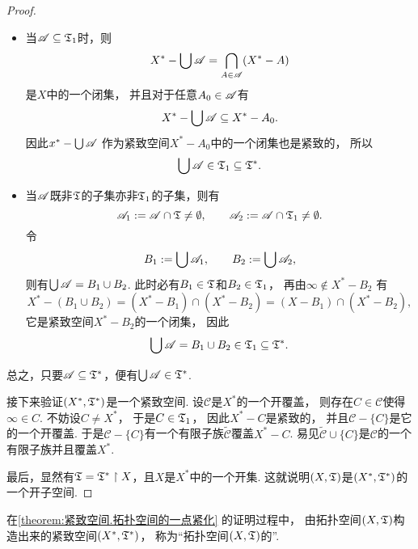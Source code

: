 \begin{theorem}
\begin{proof}
\begin{itemize}
\begin{itemize}
		\item 当\(\mathscr{A} \subseteq {\mathfrak T}_1\)时，则\begin{equation*}
			X^* - \bigcup \mathscr{A} = \bigcap_{A \in \mathscr{A}} (X^* - A)
		\end{equation*}
		是\(X\)中的一个闭集，
		并且对于任意\(A_0 \in \mathscr{A}\)有\begin{equation*}
			X^* - \bigcup \mathscr{A} \subseteq X^* - A_0.
		\end{equation*}
		因此\(x^* - \bigcup \mathscr{A}\)
		作为紧致空间\(X^* - A_0\)中的一个闭集也是紧致的，
		所以\begin{equation*}
			\bigcup \mathscr{A} \in {\mathfrak T}_1 \subseteq {\mathfrak T}^*.
		\end{equation*}

		\item 当\(\mathscr{A}\)既非\({\mathfrak T}\)的子集亦非\({\mathfrak T}_1\)的子集，则有\begin{equation*}
			\mathscr{A}_1 := \mathscr{A} \cap {\mathfrak T} \neq \emptyset,
			\qquad
			\mathscr{A}_2 := \mathscr{A} \cap {\mathfrak T}_1 \neq \emptyset.
		\end{equation*}
		令\begin{equation*}
			B_1 := \bigcup \mathscr{A}_1,
			\qquad
			B_2 := \bigcup \mathscr{A}_2,
		\end{equation*}
		则有\(\bigcup \mathscr{A} = B_1 \cup B_2\).
		此时必有\(B_1 \in {\mathfrak T}\)和\(B_2 \in {\mathfrak T}_1\)，
		再由\(\infty \notin X^* - B_2\)
		有\begin{equation*}
			X^* - (B_1 \cup B_2)
			= (X^* - B_1) \cap (X^* - B_2)
			= (X - B_1) \cap (X^* - B_2),
		\end{equation*}
		它是紧致空间\(X^* - B_2\)的一个闭集，
		因此\begin{equation*}
			\bigcup \mathscr{A}
			= B_1 \cup B_2
			\in {\mathfrak T}_1
			\subseteq {\mathfrak T}^*.
		\end{equation*}
	\end{itemize}
	总之，只要\(\mathscr{A} \subseteq {\mathfrak T}^*\)，便有\(\bigcup \mathscr{A}  \in {\mathfrak T}^*\).
\end{itemize}

\def\sfC{\mathscr{C}}
\def\wsfC{\tilde{\sfC}}
接下来验证\((X^*,{\mathfrak T}^*)\)是一个紧致空间.
设\(\sfC\)是\(X^*\)的一个开覆盖，
则存在\(C \in \sfC\)使得\(\infty \in C\).
不妨设\(C \neq X^*\)，
于是\(C \in {\mathfrak T}_1\)，
因此\(X^* - C\)是紧致的，
并且\(\sfC-\{C\}\)是它的一个开覆盖.
于是\(\sfC-\{C\}\)有一个有限子族\(\wsfC\)覆盖\(X^* - C\).
易见\(\wsfC \cup \{C\}\)是\(\sfC\)的一个有限子族并且覆盖\(X^*\).

最后，显然有\({\mathfrak T} = {\mathfrak T}^* \upharpoonright X\)，且\(X\)是\(X^*\)中的一个开集.
这就说明\((X,{\mathfrak T})\)是\((X^*,{\mathfrak T}^*)\)的一个开子空间.
\end{proof}
\end{theorem}
\begin{definition}
在\cref{theorem:紧致空间.拓扑空间的一点紧化} 的证明过程中，
由拓扑空间\((X,{\mathfrak T})\)构造出来的紧致空间\((X^*,{\mathfrak T}^*)\)，
称为“拓扑空间\((X,{\mathfrak T})\)的”.
\end{definition}

